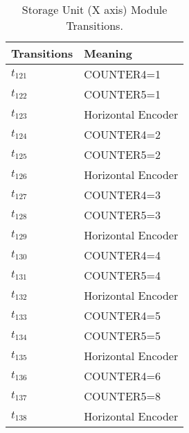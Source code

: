\begin{table}[H]
\caption{Storage Unit (X axis) Module Transitions.}
\centering
\begin{tabular}{M{5cm}M{10cm}}
Transitions & Meaning\\
\hline
\hyperlink{partialNet:t1211}{\hypertarget{partialTable:t121}{$t_{121}$}} & COUNTER4=1\\
\hyperlink{partialNet:t1221}{\hypertarget{partialTable:t122}{$t_{122}$}} & COUNTER5=1\\
\hyperlink{partialNet:t1231}{\hypertarget{partialTable:t123}{$t_{123}$}} & Horizontal Encoder\\
\hyperlink{partialNet:t1241}{\hypertarget{partialTable:t124}{$t_{124}$}} & COUNTER4=2\\
\hyperlink{partialNet:t1251}{\hypertarget{partialTable:t125}{$t_{125}$}} & COUNTER5=2\\
\hyperlink{partialNet:t1261}{\hypertarget{partialTable:t126}{$t_{126}$}} & Horizontal Encoder\\
\hyperlink{partialNet:t1271}{\hypertarget{partialTable:t127}{$t_{127}$}} & COUNTER4=3\\
\hyperlink{partialNet:t1281}{\hypertarget{partialTable:t128}{$t_{128}$}} & COUNTER5=3\\
\hyperlink{partialNet:t1291}{\hypertarget{partialTable:t129}{$t_{129}$}} & Horizontal Encoder\\
\hyperlink{partialNet:t1301}{\hypertarget{partialTable:t130}{$t_{130}$}} & COUNTER4=4\\
\hyperlink{partialNet:t1311}{\hypertarget{partialTable:t131}{$t_{131}$}} & COUNTER5=4\\
\hyperlink{partialNet:t1321}{\hypertarget{partialTable:t132}{$t_{132}$}} & Horizontal Encoder\\
\hyperlink{partialNet:t1331}{\hypertarget{partialTable:t133}{$t_{133}$}} & COUNTER4=5\\
\hyperlink{partialNet:t1341}{\hypertarget{partialTable:t134}{$t_{134}$}} & COUNTER5=5\\
\hyperlink{partialNet:t1351}{\hypertarget{partialTable:t135}{$t_{135}$}} & Horizontal Encoder\\
\hyperlink{partialNet:t1361}{\hypertarget{partialTable:t136}{$t_{136}$}} & COUNTER4=6\\
\hyperlink{partialNet:t1371}{\hypertarget{partialTable:t137}{$t_{137}$}} & COUNTER5=8\\
\hyperlink{partialNet:t1381}{\hypertarget{partialTable:t138}{$t_{138}$}} & Horizontal Encoder\\

\end{tabular}
\end{table}
